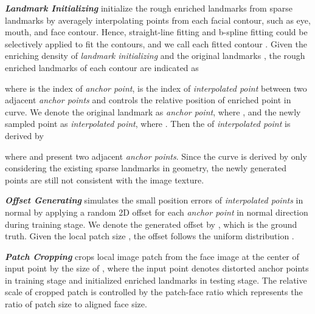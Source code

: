 \documentclass[letterpaper]{article} \usepackage{aaai23}  \usepackage{times}  \usepackage{helvet}  \usepackage{courier}  \usepackage[hyphens]{url}  \usepackage{graphicx} \urlstyle{rm} \def\UrlFont{\rm}  \usepackage{natbib}  \usepackage{caption} \frenchspacing  \setlength{\pdfpagewidth}{8.5in}  \setlength{\pdfpageheight}{11in}  \usepackage{algorithm}
\begin{document}
\vspace{5pt}
\noindent\textbf{\emph{Landmark Initializing}}
initialize the rough enriched landmarks from sparse landmarks by averagely interpolating points from each facial contour, such as eye, mouth, and face contour.
Hence, straight-line fitting and b-spline fitting \cite{knott2000interpolating} could be selectively applied to fit the contours, and we call each fitted contour .
Given the enriching density  of \emph{landmark initializing} and the original landmarks , the rough enriched landmarks  of each contour are indicated as

\vspace{-5pt}

\vspace{-5pt}

where  is the index of \emph{anchor point},  is the index of \emph{interpolated point} between two adjacent \emph{anchor points} and  controls the relative position of enriched point in curve.
We denote the original landmark as \emph{anchor point}, where , and the newly sampled point as \emph{interpolated point}, where .
Then the  of \emph{interpolated point} is derived by

\vspace{-5pt}

\vspace{-5pt}

where  and  present two adjacent \emph{anchor points}.
Since the curve is derived by only considering the existing sparse landmarks in geometry, the newly generated points are still not consistent with the image texture.

\vspace{5pt}
\noindent\textbf{\emph{Offset Generating}}
simulates the small position errors of \emph{interpolated points} in normal by applying a random 2D offset for each \emph{anchor point} in normal direction during training stage.
We denote the generated offset by , which is the ground truth.
Given the local patch size , the offset follows the uniform distribution .

\vspace{5pt}
\noindent\textbf{\emph{Patch Cropping}}
crops local image patch from the face image at the center of input point by the size of , where the input point denotes distorted anchor points  in training stage and initialized enriched landmarks  in testing stage.
The relative scale of cropped patch is controlled by the patch-face ratio which represents the ratio of patch size to aligned face size.
\end{document}
